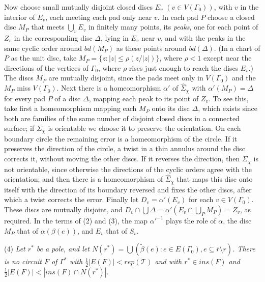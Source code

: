 {Now choose small mutually disjoint closed discs $E_v$ $(v \in V(\Gamma_0))$, with $v$ in the interior of $E_v$, each meeting each pad only near $v$. In each pad $P$ choose a closed disc $M_P$ that meets $\bigcup_v E_v$ in finitely many points, its \textit{peaks}, one for each point of $Z_v$ in the corresponding disc $\Delta$, lying in $E_v$ near $v$, and with the peaks in the same cyclic order around $bd(M_P)$ as these points around $bd(\Delta)$. (In a chart of $P$ as the unit disc, take $M_P = \{z \colon |z| \le \rho(z/|z|)\}$, where $\rho < 1$ except near the directions of the vertices of $\Gamma_0$, where $\rho$ rises just enough to reach the discs $E_v$.) The discs $M_P$ are mutually disjoint, since the pads meet only in $V(\Gamma_0)$ and the $M_P$ miss $V(\Gamma_0)$. Next there is a homeomorphism $\alpha'$ of $\hat{\Sigma}_\chi$ with $\alpha'(M_P) = \Delta$ for every pad $P$ of a disc $\Delta$, mapping each peak to its point of $Z_v$. To see this, take first a homeomorphism mapping each $M_P$ onto its disc $\Delta$, which exists since both are families of the same number of disjoint closed discs in a connected surface; if $\Sigma_\chi$ is orientable we choose it to preserve the orientation. On each boundary circle the remaining error is a homeomorphism of the circle. If it preserves the direction of the circle, a twist in a thin annulus around the disc corrects it, without moving the other discs. If it reverses the direction, then $\Sigma_\chi$ is not orientable, since otherwise the directions of the cyclic orders agree with the orientation; and then there is a homeomorphism of $\hat{\Sigma}_\chi$ that maps this disc onto itself with the direction of its boundary reversed and fixes the other discs, after which a twist corrects the error. Finally let $D_v = \alpha'(E_v)$ for each $v \in V(\Gamma_0)$. These discs are mutually disjoint, and $D_v \cap \bigcup \Delta = \alpha'(E_v \cap \bigcup_P M_P) = Z_v$, as required. In the terms of (2) and (3), the map $\alpha'^{-1}$ plays the role of $\alpha$, the disc $M_P$ that of $\alpha(\beta(e))$, and $E_v$ that of $S_v$.}

\hspace*{12pt}(4) \textit{Let $r^*$ be a pole, and let $N(r^*) = \bigcup (\tilde{\beta}(e) \colon e \in E(\Gamma_0), e \subseteq \bar{r}\setminus r)$. There is no circuit $F$ of $\Gamma^*$ with $\frac{1}{2}|E(F)| < rep(\mathscr{T})$ and with $r^* \in ins(F)$ and $\frac{1}{2}|E(F)| < |ins(F) \cap N(r^*)|$.}


